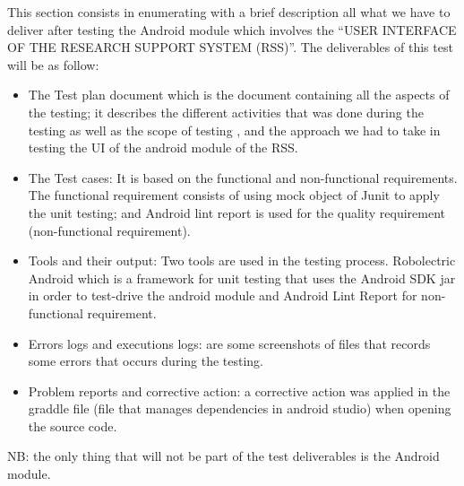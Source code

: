 This section consists in enumerating with a brief description all what we have to deliver after testing the Android module which involves the “USER INTERFACE OF THE RESEARCH SUPPORT SYSTEM (RSS)”. The deliverables of this test will be as follow:
\begin{itemize}
        \item The Test plan document which is the document containing all the aspects of the testing; it describes the different activities that was done during the testing as well as the scope of testing , and the approach we had to take in testing the UI of the android module of the RSS.
        \item The Test cases: It is based on the functional and non-functional requirements.  The functional requirement consists of using mock object of Junit to apply the unit testing; and Android lint report is used for the quality requirement (non-functional requirement).

        \item Tools and their output: Two tools are used in the testing process. Robolectric Android which is a framework for unit testing that uses the Android SDK jar in order to test-drive the android module and  Android Lint Report for non-functional requirement.

        \item Errors logs and executions logs: are some screenshots of files that records some errors that occurs during the testing.

        \item Problem reports and corrective action: a corrective action was applied in the graddle file (file that manages dependencies in android studio) when opening the source code.     
\end{itemize}
NB: the only thing that will not be part of the test deliverables is the Android module.                                                                              